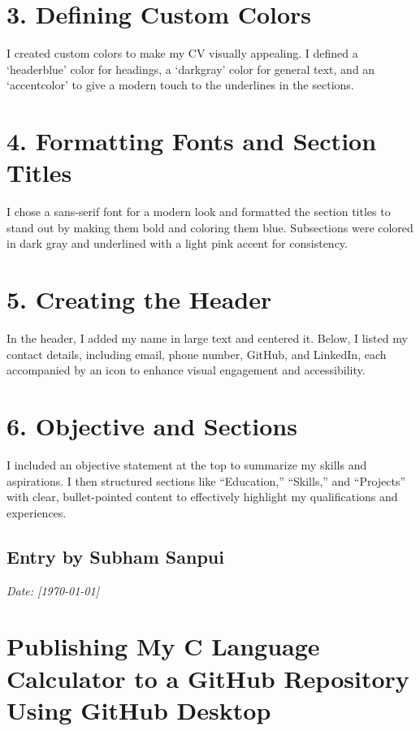 \documentclass[12pt, a4paper]{article}
\begin{document}
\section*{3. Defining Custom Colors}
I created custom colors to make my CV visually appealing. I defined a ‘headerblue’ color for headings, a ‘darkgray’ color for general text, and an ‘accentcolor’ to give a modern touch to the underlines in the sections.

\section*{4. Formatting Fonts and Section Titles}
I chose a sans-serif font for a modern look and formatted the section titles to stand out by making them bold and coloring them blue. Subsections were colored in dark gray and underlined with a light pink accent for consistency.

\section*{5. Creating the Header}
In the header, I added my name in large text and centered it. Below, I listed my contact details, including email, phone number, GitHub, and LinkedIn, each accompanied by an icon to enhance visual engagement and accessibility.

\section*{6. Objective and Sections}
I included an objective statement at the top to summarize my skills and aspirations. I then structured sections like “Education,” “Skills,” and “Projects” with clear, bullet-pointed content to effectively highlight my qualifications and experiences.

\newpage
{}%
\vspace{-2cm}
\subsection*{Entry by Subham Sanpui}
\textit{Date: [\today]}\\
\section*{Publishing My C Language Calculator to a GitHub Repository Using GitHub Desktop}
\end{document}
